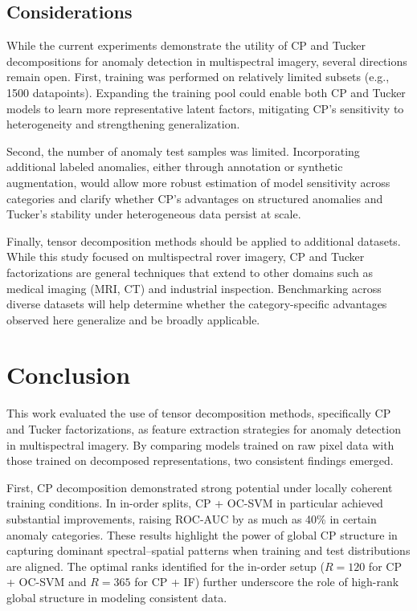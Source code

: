 \documentclass[11pt]{article}
\begin{document}
\subsection{Considerations}

While the current experiments demonstrate the utility of CP and Tucker decompositions for anomaly detection in multispectral imagery, several directions remain open. First, training was performed on relatively limited subsets (e.g., 1500 datapoints). Expanding the training pool could enable both CP and Tucker models to learn more representative latent factors, mitigating CP’s sensitivity to heterogeneity and strengthening generalization.  

Second, the number of anomaly test samples was limited. Incorporating additional labeled anomalies, either through annotation or synthetic augmentation, would allow more robust estimation of model sensitivity across categories and clarify whether CP’s advantages on structured anomalies and Tucker’s stability under heterogeneous data persist at scale.  

Finally, tensor decomposition methods should be applied to additional datasets. While this study focused on multispectral rover imagery, CP and Tucker factorizations are general techniques that extend to other domains such as medical imaging (MRI, CT) and industrial inspection. Benchmarking across diverse datasets will help determine whether the category-specific advantages observed here generalize and be broadly applicable.  


\section{Conclusion}
\label{sec:conclusion}

This work evaluated the use of tensor decomposition methods, specifically CP and Tucker factorizations, as feature extraction strategies for anomaly detection in multispectral imagery. By comparing models trained on raw pixel data with those trained on decomposed representations, two consistent findings emerged.    

First, CP decomposition demonstrated strong potential under locally coherent training conditions. In in-order splits, CP + OC-SVM in particular achieved substantial improvements, raising ROC-AUC by as much as 40\% in certain anomaly categories. These results highlight the power of global CP structure in capturing dominant spectral–spatial patterns when training and test distributions are aligned. The optimal ranks identified for the in-order setup (\(R=120\) for CP + OC-SVM and \(R=365\) for CP + IF) further underscore the role of high-rank global structure in modeling consistent data.  
\end{document}
